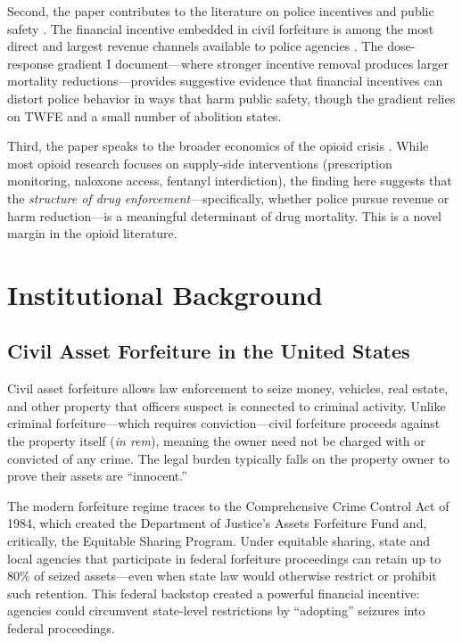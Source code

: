 \documentclass[12pt]{article}
\begin{document}
Second, the paper contributes to the literature on police incentives and public safety \citep{mello2019more, chalfin2022police, kellner2022deterrent}. The financial incentive embedded in civil forfeiture is among the most direct and largest revenue channels available to police agencies \citep{worrall2010use}. The dose-response gradient I document---where stronger incentive removal produces larger mortality reductions---provides suggestive evidence that financial incentives can distort police behavior in ways that harm public safety, though the gradient relies on TWFE and a small number of abolition states.

Third, the paper speaks to the broader economics of the opioid crisis \citep{ruhm2019drivers, alpert2022origins, case2015rising}. While most opioid research focuses on supply-side interventions (prescription monitoring, naloxone access, fentanyl interdiction), the finding here suggests that the \emph{structure of drug enforcement}---specifically, whether police pursue revenue or harm reduction---is a meaningful determinant of drug mortality. This is a novel margin in the opioid literature.



\section{Institutional Background}
\label{sec:background}

\subsection{Civil Asset Forfeiture in the United States}

Civil asset forfeiture allows law enforcement to seize money, vehicles, real estate, and other property that officers suspect is connected to criminal activity. Unlike criminal forfeiture---which requires conviction---civil forfeiture proceeds against the property itself (\emph{in rem}), meaning the owner need not be charged with or convicted of any crime. The legal burden typically falls on the property owner to prove their assets are ``innocent.''

The modern forfeiture regime traces to the Comprehensive Crime Control Act of 1984, which created the Department of Justice's Assets Forfeiture Fund and, critically, the Equitable Sharing Program. Under equitable sharing, state and local agencies that participate in federal forfeiture proceedings can retain up to 80\% of seized assets---even when state law would otherwise restrict or prohibit such retention. This federal backstop created a powerful financial incentive: agencies could circumvent state-level restrictions by ``adopting'' seizures into federal proceedings.
\end{document}
